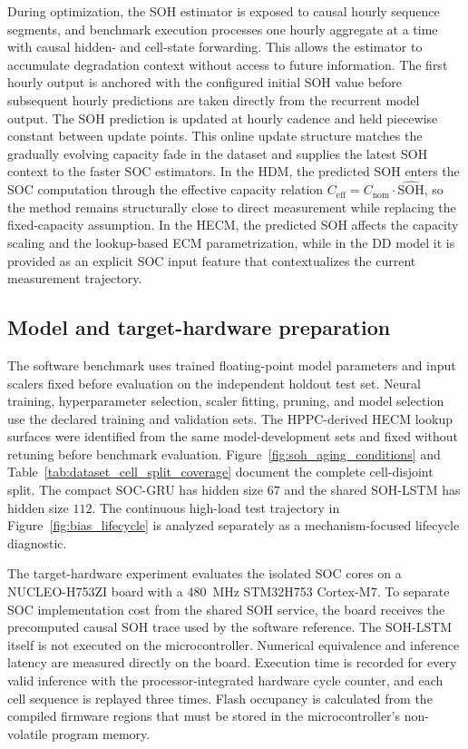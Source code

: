 \documentclass[review,nopreprintline]{elsarticle}
\begin{document}
During optimization, the SOH estimator is exposed to causal hourly sequence segments, and benchmark execution processes one hourly aggregate at a time with causal hidden- and cell-state forwarding. This allows the estimator to accumulate degradation context without access to future information. The first hourly output is anchored with the configured initial SOH value before subsequent hourly predictions are taken directly from the recurrent model output. The SOH prediction is updated at hourly cadence and held piecewise constant between update points. This online update structure matches the gradually evolving capacity fade in the dataset and supplies the latest SOH context to the faster SOC estimators. In the HDM, the predicted SOH enters the SOC computation through the effective capacity relation $C_{\mathrm{eff}} = C_{\mathrm{nom}} \cdot \widehat{\mathrm{SOH}}$, so the method remains structurally close to direct measurement while replacing the fixed-capacity assumption. In the HECM, the predicted SOH affects the capacity scaling and the lookup-based ECM parametrization, while in the DD model it is provided as an explicit SOC input feature that contextualizes the current measurement trajectory.

\subsection{Model and target-hardware preparation}
The software benchmark uses trained floating-point model parameters and input scalers fixed before evaluation on the independent holdout test set. Neural training, hyperparameter selection, scaler fitting, pruning, and model selection use the declared training and validation sets. The HPPC-derived HECM lookup surfaces were identified from the same model-development sets and fixed without retuning before benchmark evaluation. Figure~\ref{fig:soh_aging_conditions} and Table~\ref{tab:dataset_cell_split_coverage} document the complete cell-disjoint split. The compact SOC-GRU has hidden size $67$ and the shared SOH-LSTM has hidden size $112$. The continuous high-load test trajectory in Figure~\ref{fig:bias_lifecycle} is analyzed separately as a mechanism-focused lifecycle diagnostic.

The target-hardware experiment evaluates the isolated SOC cores on a NUCLEO-H753ZI board with a \SI{480}{MHz} STM32H753 Cortex-M7. To separate SOC implementation cost from the shared SOH service, the board receives the precomputed causal SOH trace used by the software reference. The SOH-LSTM itself is not executed on the microcontroller. Numerical equivalence and inference latency are measured directly on the board. Execution time is recorded for every valid inference with the processor-integrated hardware cycle counter, and each cell sequence is replayed three times. Flash occupancy is calculated from the compiled firmware regions that must be stored in the microcontroller's non-volatile program memory.
\end{document}
